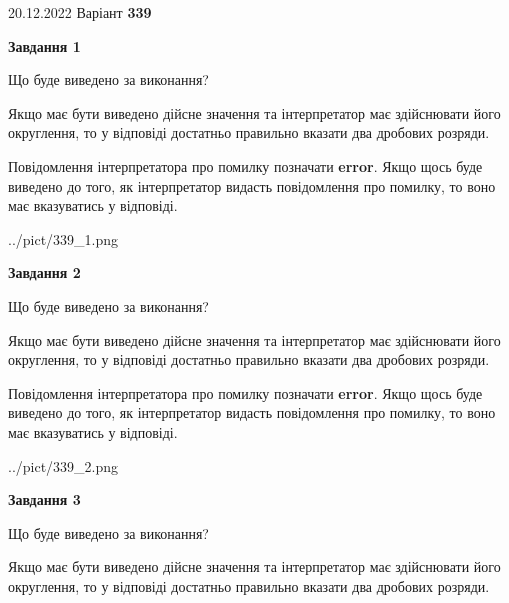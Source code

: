 \documentclass[12pt, ukrainian]{article}
\begin{document}
{20.12.2022 Варіант \No \textbf { 339 }\par}
{
\begin {Large}

{\begin {center}\textbf{Завдання 1}\end {center}}\par
Що буде виведено за виконання? \par

Якщо має бути виведено дійсне значення та інтерпретатор має здійснювати його округлення, 
то у відповіді достатньо правильно вказати два дробових розряди.

Повідомлення інтерпретатора про помилку позначати \textbf{error}.
Якщо щось буде виведено до того, як інтерпретатор видасть повідомлення про помилку, 
то воно має вказуватись у відповіді. \par

\begin{center}
	{../pict/339_1.png}
\end{center}
\newpage

{\begin {center}\textbf{Завдання 2}\end {center}}\par
Що буде виведено за виконання? \par

Якщо має бути виведено дійсне значення та інтерпретатор має здійснювати його округлення, 
то у відповіді достатньо правильно вказати два дробових розряди.

Повідомлення інтерпретатора про помилку позначати \textbf{error}.
Якщо щось буде виведено до того, як інтерпретатор видасть повідомлення про помилку, 
то воно має вказуватись у відповіді. \par

\begin{center}
	{../pict/339_2.png}
\end{center}
\newpage

{\begin {center}\textbf{Завдання 3}\end {center}}\par
Що буде виведено за виконання? \par

Якщо має бути виведено дійсне значення та інтерпретатор має здійснювати його округлення, 
то у відповіді достатньо правильно вказати два дробових розряди.


\end{Large}}
\end{document}

